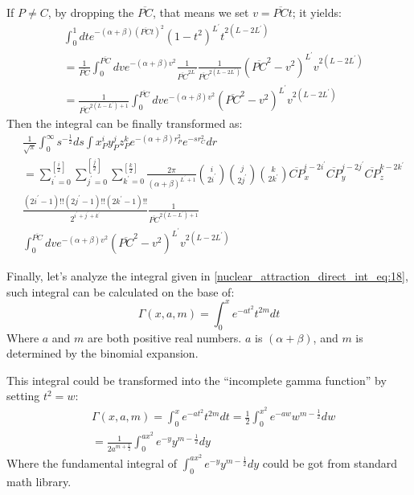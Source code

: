 If $P \neq C$, by dropping the $\overline{PC}$, that means we set $v = \overline{PC}t$; it yields:
\begin{equation}
 \begin{split}
&\int^{1}_{0} dt
e^{-(\alpha+\beta)(\overline{PC}t)^{2}}
(1-t^{2})^{L^{'} }t^{2(L-2L^{'})} \\  
&=\frac{1}{\overline{PC}}\int^{\overline{PC}}_{0}dv e^{-(\alpha+\beta)v^{2}} 
\frac{1}{\overline{PC}^{2L^{'}}}\frac{1}{\overline{PC}^{2(L-2L^{'})}}
(\overline{PC}^{2}-v^{2})^{L^{'}}v^{2(L-2L^{'})} \\
&=\frac{1}{\overline{PC}^{2(L-L^{'})+1}}\int^{\overline{PC}}_{0}dv e^{-(\alpha+\beta)v^{2}} 
(\overline{PC}^{2}-v^{2})^{L^{'}}v^{2(L-2L^{'})}
 \end{split}
\label{nuclear_attraction_direct_int_eq:17}
\end{equation}
Then the integral can be finally transformed as:
\begin{equation}
 \label{nuclear_attraction_direct_int_eq:14}
\begin{split}
&\frac{1}{\sqrt{\pi}} 
 \int^{\infty}_{0} s^{-\frac{1}{2}} ds 
 \int x_{P}^{i}y_{P}^{j}z_{P}^{k} e^{-(\alpha+\beta)r_{P}^{2}}e^{-sr_{C}^{2}} dr \\
&= 
\sum_{i^{'}=0}^{\left[ \frac{i}{2}\right]}
\sum_{j^{'}=0}^{\left[ \frac{j}{2}\right]}
\sum_{k^{'}=0}^{\left[ \frac{k}{2}\right]} 
\frac{2\pi}{(\alpha+\beta)^{L^{'}+1}}
\binom{i}{2i^{'}}\binom{j}{2j^{'}}\binom{k}{2k^{'}}
\overline{CP}_{x}^{i-2i^{'}}\overline{CP}_{y}^{j-2j^{'}}\overline{CP}_{z}^{k-2k^{'}} \\
&\frac{(2i^{'}-1)!!(2j^{'}-1)!!(2k^{'}-1)!!}{2^{i^{'}+j^{'}+k^{'}}} 
\frac{1}{\overline{PC}^{2(L-L^{'})+1}} \\
&\int^{\overline{PC}}_{0}dv e^{-(\alpha+\beta)v^{2}} 
(\overline{PC}^{2}-v^{2})^{L^{'}}v^{2(L-2L^{'})} 
\end{split}
\label{nuclear_attraction_direct_int_eq:18}
\end{equation}

Finally, let's analyze the integral given in \ref{nuclear_attraction_direct_int_eq:18}, such integral
can be calculated on the base of:
\begin{equation}
\Gamma(x, a, m) = \int^{x}_{0} e^{-at^{2}}t^{2m} dt
 \label{nuclear_attraction_direct_int_eq:19}
\end{equation}
Where $a$ and $m$ are both positive real numbers. $a$ is $(\alpha+\beta)$, and 
$m$ is determined by the binomial expansion.

This integral could be transformed into the  ``incomplete gamma function'' by setting 
$t^{2}=w$:
\begin{align}
&\Gamma(x, a, m) = \int^{x}_{0} e^{-at^{2}}t^{2m} dt = 
 \frac{1}{2}\int^{x^{2}}_{0} e^{-aw}w^{m-\frac{1}{2}} dw \nonumber \\
&=
\frac{1}{2a^{m+\frac{1}{2}}}\int^{ax^{2}}_{0} 
e^{-y}y^{m-\frac{1}{2}} dy
\label{nuclear_attraction_direct_int_eq:20}
\end{align}
Where the fundamental integral of $\int^{ax^{2}}_{0} e^{-y}y^{m-\frac{1}{2}} dy$
could be got from standard math library. 

